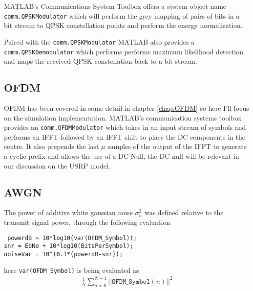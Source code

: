 MATLAB's Communications System Toolbox offers %
a system object name \texttt{comm.QPSKModulator} which %
will perform the grey mapping of pairs of bits in a %
bit stream to QPSK constellation points and perform %
the energy normalisation.

Paired with the \texttt{comm.QPSKModulator} MATLAB also %
provides a \texttt{comm.QPSKDemodulator} which performs %
performs maximum likelihood detection and maps %
the received QPSK constellation back to a bit %
stream.

\subsection{OFDM}

OFDM has been covered in some detail in chapter %
\ref{chap:OFDM} so here I'll focus on the simulation %
implementation. MATLAB's communication systems %
toolbox provides an \texttt{comm.OFDMModulator} which %
takes in an input stream of symbols and performs %
an IFFT followed by an IFFT shift to place the DC %
components in the centre. It also prepends the %
last $\mu$ samples of the output of the IFFT to %
generate a cyclic prefix and allows the use %
of a DC Null, the DC null will be relevant in %
our discussion on the USRP model.

\subsection{AWGN}

The power of additive white gaussian noise $\sigma_n^{2}$ %
was defined relative to the transmit signal power, through %
the following evaluation

\texttt{%
powerdB = 10*log10(var(OFDM\_Symbol));\\%
snr = EbNo + 10*log10(BitsPerSymbol);\\%
noiseVar = 10\textasciicircum(0.1*(powerdB-snr));}

here \texttt{var(OFDM\_Symbol)} is being evaluated %
as 
\begin{align}
	\frac{1}{N} %
	\sum_{n=0}^{N-1} \lvert\lvert \texttt{OFDM\_Symbol}%
	(n) \rvert\rvert^{2}
\end{align}

